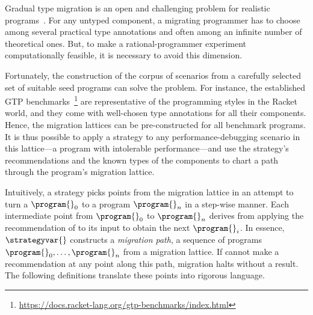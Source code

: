 \newcommand{\gtpurl}{\url{https://docs.racket-lang.org/gtp-benchmarks/index.html}}

Gradual type migration is an open and challenging problem for realistic
programs~\cite{rch:in-out-infer-gt, km:ts-type-evo,
mp:gt-decidable, ccew:gt-migrate, gc:gt-infer,
cagg-solver-based-migration,clps-popl-2020,js-infer,ruby-static-infer,unif-infer,
msi:gt-infer-hm,dyn-infer-ruby,profile-guided-typing,jstrace,gen-ts-decl,
lambdanet,nl2ptype,learn-types-big-data,ml-ts}. For
any untyped component, a migrating programmer has to choose among several
practical type annotations and often among an infinite number of theoretical
ones. But, to make a rational-programmer experiment computationally feasible, it
is necessary to avoid this dimension.

Fortunately, the construction of the corpus of scenarios from a carefully
selected set of suitable seed programs can solve the problem. For
instance, the established GTP
benchmarks~\cite{gtnffvf-jfp-2019}\footnote{\gtpurl{}} are
representative of the programming styles in the Racket world, and they
come with well-chosen type annotations for all their components.  Hence,
the migration lattices can be pre-constructed for all benchmark programs.
It is thus possible to apply a strategy to any performance-debugging
scenario in this lattice---a program with intolerable performance---and
use the strategy's recommendations and the known types of the components
to chart a path through the program's migration lattice.

Intuitively,  a strategy \strategyvar{} picks points from the migration
lattice in an attempt to turn a $\program{}_0$ to a program $\program{}_n$
in  a step-wise manner. Each intermediate point from $\program{}_0$ to
$\program{}_n$ derives from applying the recommendation of \strategyvar{}
to its input to obtain the next $\program{}_i$.  In essence,
$\strategyvar{}$ constructs a \emph{migration path}, a sequence of
programs ${\program{}_0}, \ldots, {\program{}_n}$ from a migration
lattice. If \strategyvar{} cannot make a recommendation at any point along
this path, migration halts without a result. The following
definitions translate these points into rigorous language. 

